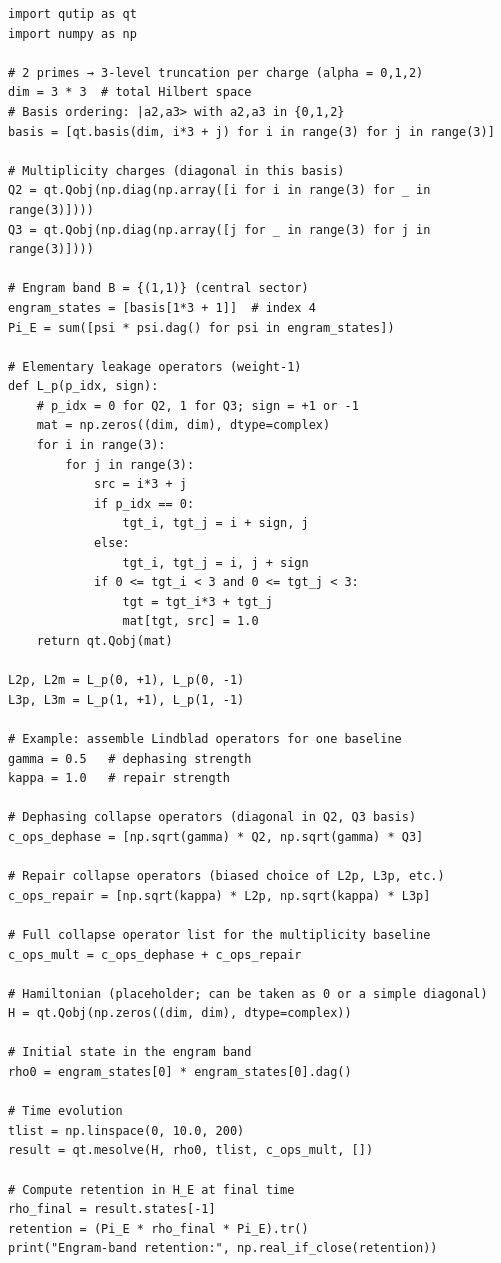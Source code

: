 \documentclass[11pt]{article}
\begin{document}
\begin{verbatim}
import qutip as qt
import numpy as np

# 2 primes → 3-level truncation per charge (alpha = 0,1,2)
dim = 3 * 3  # total Hilbert space
# Basis ordering: |a2,a3> with a2,a3 in {0,1,2}
basis = [qt.basis(dim, i*3 + j) for i in range(3) for j in range(3)]

# Multiplicity charges (diagonal in this basis)
Q2 = qt.Qobj(np.diag(np.array([i for i in range(3) for _ in range(3)])))
Q3 = qt.Qobj(np.diag(np.array([j for _ in range(3) for j in range(3)])))

# Engram band B = {(1,1)} (central sector)
engram_states = [basis[1*3 + 1]]  # index 4
Pi_E = sum([psi * psi.dag() for psi in engram_states])

# Elementary leakage operators (weight-1)
def L_p(p_idx, sign):
    # p_idx = 0 for Q2, 1 for Q3; sign = +1 or -1
    mat = np.zeros((dim, dim), dtype=complex)
    for i in range(3):
        for j in range(3):
            src = i*3 + j
            if p_idx == 0:
                tgt_i, tgt_j = i + sign, j
            else:
                tgt_i, tgt_j = i, j + sign
            if 0 <= tgt_i < 3 and 0 <= tgt_j < 3:
                tgt = tgt_i*3 + tgt_j
                mat[tgt, src] = 1.0
    return qt.Qobj(mat)

L2p, L2m = L_p(0, +1), L_p(0, -1)
L3p, L3m = L_p(1, +1), L_p(1, -1)

# Example: assemble Lindblad operators for one baseline
gamma = 0.5   # dephasing strength
kappa = 1.0   # repair strength

# Dephasing collapse operators (diagonal in Q2, Q3 basis)
c_ops_dephase = [np.sqrt(gamma) * Q2, np.sqrt(gamma) * Q3]

# Repair collapse operators (biased choice of L2p, L3p, etc.)
c_ops_repair = [np.sqrt(kappa) * L2p, np.sqrt(kappa) * L3p]

# Full collapse operator list for the multiplicity baseline
c_ops_mult = c_ops_dephase + c_ops_repair

# Hamiltonian (placeholder; can be taken as 0 or a simple diagonal)
H = qt.Qobj(np.zeros((dim, dim), dtype=complex))

# Initial state in the engram band
rho0 = engram_states[0] * engram_states[0].dag()

# Time evolution
tlist = np.linspace(0, 10.0, 200)
result = qt.mesolve(H, rho0, tlist, c_ops_mult, [])

# Compute retention in H_E at final time
rho_final = result.states[-1]
retention = (Pi_E * rho_final * Pi_E).tr()
print("Engram-band retention:", np.real_if_close(retention))
\end{verbatim}
\end{document}
